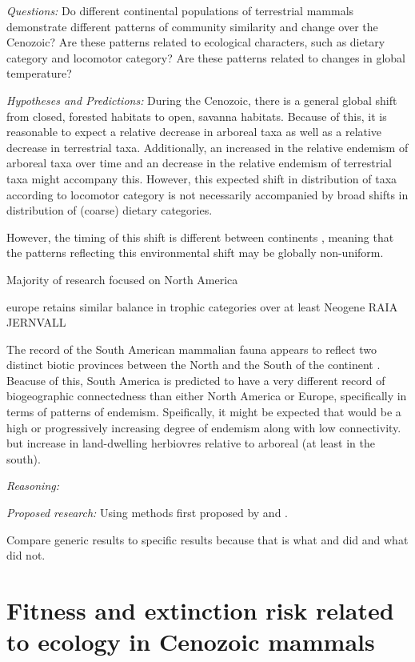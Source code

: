 \documentclass[12pt,letterpaper]{article}
\begin{document}
\textit{Questions:} Do different continental populations of terrestrial mammals demonstrate different patterns of community similarity and change over the Cenozoic? Are these patterns related to ecological characters, such as dietary category and locomotor category? Are these patterns related to changes in global temperature?

\textit{Hypotheses and Predictions:}
During the Cenozoic, there is a general global shift from closed, forested habitats to open, savanna habitats. Because of this, it is reasonable to expect a relative decrease in arboreal taxa as well as a relative decrease in terrestrial taxa. Additionally, an increased in the relative endemism of arboreal taxa over time and an decrease in the relative endemism of terrestrial taxa might accompany this. However, this expected shift in distribution of taxa according to locomotor category is not necessarily accompanied by broad shifts in distribution of (coarse) dietary categories.

However, the timing of this shift is different between continents \citep{Stromberg2005,Stromberg2013}, meaning that the patterns reflecting this environmental shift may be globally non-uniform.

Majority of research focused on North America

europe retains similar balance in trophic categories over at least Neogene RAIA JERNVALL 

The record of the South American mammalian fauna appears to reflect two distinct biotic provinces between the North and the South of the continent \citep{Macfadden1997,Macfadden2006,Flynn1998a,Patterson1968}. Beacuse of this, South America is predicted to have a very different record of biogeographic connectedness than either North America or Europe, specifically in terms of patterns of endemism. Speifically, it might be expected that would be a high or progressively increasing degree of endemism along with low connectivity. but increase in land-dwelling herbiovres relative to arboreal (at least in the south).

\textit{Reasoning:}

\textit{Proposed research:}
Using methods first proposed by \citet{Sidor2013} and \citet{Vilhena2013}.

Compare generic results to specific results because that is what \citet{Jernvall2002} and \citet{Jernvall2004} did and what \citet{Tomiya2013} did not.


\section{Fitness and extinction risk related to ecology in Cenozoic mammals}
\end{document}
